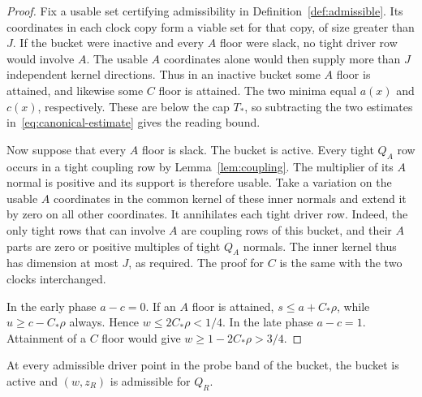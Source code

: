 \begin{proof}
Fix a usable set certifying admissibility in
Definition~\ref{def:admissible}. Its coordinates in each clock copy form
a viable set for that copy, of size greater than \(J\). If the bucket
were inactive and every \(A\) floor were slack, no tight driver row
would involve \(A\). The usable \(A\) coordinates alone would then
supply more than \(J\) independent kernel directions. Thus in an
inactive bucket some \(A\) floor is attained, and likewise some
\(C\) floor is attained. The two minima equal \(a(x)\) and \(c(x)\),
respectively. These are below the cap \(T_*\), so subtracting the two
estimates in~\eqref{eq:canonical-estimate} gives the reading bound.

Now suppose that every \(A\) floor is slack. The bucket is active.
Every tight \(Q_A\) row occurs in a tight coupling row by
Lemma~\ref{lem:coupling}. The multiplier of its \(A\) normal is
positive and its support is therefore usable. Take a variation on
the usable \(A\) coordinates in the common kernel of these inner
normals and extend it by zero on all other coordinates. It annihilates
each tight driver row. Indeed, the only tight rows that can involve
\(A\) are coupling rows of this bucket, and their \(A\) parts are zero
or positive multiples of tight \(Q_A\) normals. The inner kernel thus
has dimension at most \(J\), as required. The proof for \(C\) is the
same with the two clocks interchanged.

In the early phase \(a-c=0\). If an \(A\) floor is attained,
\(s\le a+C_*\rho\), while \(u\ge c-C_*\rho\) always. Hence
\(w\le2C_*\rho<1/4\). In the late phase \(a-c=1\). Attainment
of a \(C\) floor would give \(w\ge1-2C_*\rho>3/4\).
\end{proof}

\begin{lemma}\label{lem:resource-transfer}
At every admissible driver point in the probe band of the bucket,
the bucket is active and \((w,z_R)\) is admissible for \(Q_R\).
\end{lemma}

